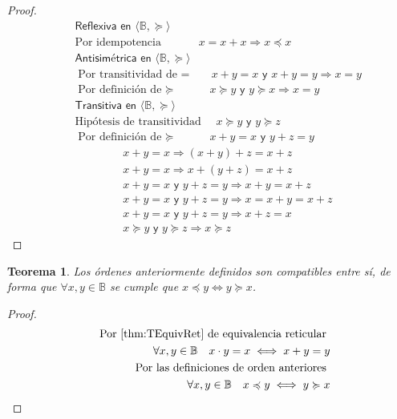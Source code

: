 \documentclass[final,12pt,a4paper,twoside,fleqn]{extbook}
\newcommand{\sthen}{\ensuremath{\Longrightarrow}}
\newcommand{\then}{\ensuremath{\sthen}}
\newcommand{\setB}{\ensuremath{\mathbb{B}}}
\newtheorem{thm}{Teorema}[chapter]
\theoremstyle{definition}
\theoremstyle{remark}
\begin{document}
\begin{proof}
\begin{eqnarray}
\nonumber
&&\textsf{Reflexiva en \(\langle\setB,\succcurlyeq\rangle\)  }\\
&&\text{Por idempotencia }\qquad\quad x = x + x \then x \preccurlyeq x\\
&&\textsf{Antisimétrica en \(\langle\setB,\succcurlyeq\rangle\)  }\\
&&\text{Por transitividad  de \(=\) } \quad x + y = x \textsf{ y } x + y = y
\then x = y\\
&&\text{Por definición de \(\succcurlyeq\) } \;\qquad x \succcurlyeq y
\textsf{ y } y \succcurlyeq x \then x = y\\
&&\textsf{Transitiva en \(\langle\setB,\succcurlyeq\rangle\)  }\\
&&\text{Hipótesis de transitividad } \quad x \succcurlyeq y \textsf{ y } y
\succcurlyeq z\\
&&\text{Por definición de \(\succcurlyeq\) } \;\qquad x + y = x \textsf{ y }
y + z = y\\
&&\qquad\;\qquad x + y = x \then (x + y) + z = x + z\\
&&\qquad\;\qquad x + y = x \then x + (y + z) = x + z\\
&&\qquad\;\qquad x + y = x \textsf{ y } y + z = y \then x + y = x + z\\
&&\qquad\;\qquad x + y = x \textsf{ y } y + z = y \then x = x + y = x + z\\
&&\qquad\;\qquad x + y = x \textsf{ y } y + z = y \then x + z = x\\
&&\qquad\;\qquad x \succcurlyeq y \textsf{ y } y \succcurlyeq z \then x
\succcurlyeq z
\end{eqnarray}
\end{proof}



\begin{thm}
Los órdenes anteriormente definidos son compatibles entre sí, de forma que \(
\forall x,y \in \setB \) se cumple que \( x \preccurlyeq y \iff y
\succcurlyeq x \).
\end{thm}



\begin{proof}
\begin{eqnarray}
\nonumber
&&\text{Por \ref{thm:TEquivRet} de equivalencia reticular }\\
&&\forall x,y \in \setB \quad x \cdot y = x \iff x + y = y\\ \nonumber
&&\text{Por las definiciones de orden anteriores }\\
&&\forall x,y \in \setB \quad x \preccurlyeq y \iff y \succcurlyeq x
\end{eqnarray}
\end{proof}
\end{document}

